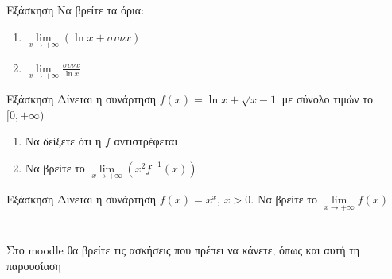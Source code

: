 \documentclass[greek]{beamer}
\begin{document}
\begin{frame}{Εξάσκηση}
 Να βρείτε τα όρια:
 \begin{enumerate}
  \item $\lim\limits_{x \to +\infty}{\left( \ln x+συνx \right)}$ \pause
  \item $\lim\limits_{x \to +\infty}{ \frac{συνx}{\ln x} }$
 \end{enumerate}
\end{frame}

\begin{frame}{Εξάσκηση}
 Δίνεται η συνάρτηση $f(x)=\ln x + \sqrt{x-1}$ με σύνολο τιμών το $[0,+\infty)$
 \begin{enumerate}
  \item Να δείξετε ότι η $f$ αντιστρέφεται \pause
  \item Να βρείτε το $\lim\limits_{x \to +\infty}{ \left( x^2f^{-1}(x) \right)  }$
 \end{enumerate}
\end{frame}

\begin{frame}{Εξάσκηση}
 Δίνεται η συνάρτηση $f(x)=x^x$, $x>0$. Να βρείτε το $\lim\limits_{x \to +\infty}{ f(x)  }$
\end{frame}

\section{}
\begin{frame}
 Στο moodle θα βρείτε τις ασκήσεις που πρέπει να κάνετε, όπως και αυτή τη παρουσίαση
\end{frame}
\end{document}
